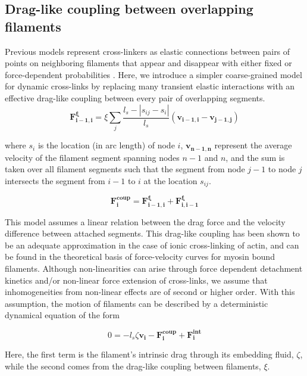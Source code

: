 \subsection{Drag-like coupling between overlapping filaments}
\label{exp_drag}
Previous models represent cross-linkers as elastic connections between pairs of points on neighboring filaments that appear and disappear with either fixed or force-dependent probabilities \cite{model_taeyoon,theo_crosslinknonlinear}.  Here, we introduce a simpler coarse-grained model for dynamic cross-links by replacing many transient elastic interactions with an effective drag-like coupling between every pair of overlapping segments.
\begin{equation}
\label{eqn:drag}
\mathbf{F^{\xi}_{i-1,i}} = \xi \sum_j \frac{l_s-|s_{ij}-s_i|}{l_s}  (\mathbf{v_{i-1,i}}-\mathbf{v_{j-1,j}}) 
\end{equation}

where $s_i$ is the location (in arc length) of node $i$, $\mathbf{v_{n-1,n}}$ represent the average velocity of the filament segment spanning nodes $n-1$ and $n$, and the sum is taken over all filament segments such that the segment from node $j-1$ to node $j$ intersects the segment from $i-1$ to $i$ at the location $s_{ij}$.

\begin{equation}
\label{eqn:drag}
\mathbf{F^{coup}_{i}} = \mathbf{F^{\xi}_{i-1,i}} + \mathbf{F^{\xi}_{i,i-1}} 
\end{equation}

This model assumes a linear relation between the drag force and the velocity difference between attached segments.  This drag-like coupling has been shown to be an adequate approximation in the case of ionic cross-linking of actin\cite{mol_fric,theo_hydroish2}, and can be found in the theoretical basis of force-velocity curves for myosin bound filaments\cite{theo_frictionShila}. Although non-linearities can arise through force dependent detachment kinetics and/or non-linear force extension of cross-links, we assume that inhomogeneities from non-linear effects are of second or higher order. With this assumption, the motion of filaments can be described by a deterministic dynamical equation of the form

\begin{equation}
\label{eqn:syst1}
0 = -l_s\zeta\mathbf{ v_i} -\mathbf{F^{coup}_i}+ \mathbf{F^{int}_i}
\end{equation}

Here, the first term is the filament's intrinsic drag through its embedding fluid, $\zeta$, while the second comes from the drag-like coupling between filaments, $\xi$.  

